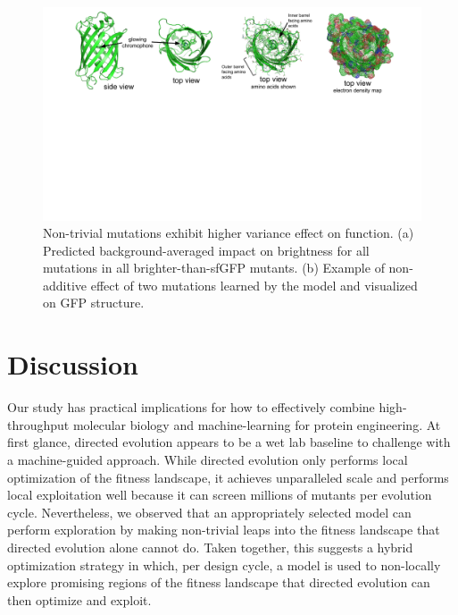 \begin{figure}
  \includegraphics[width=1\linewidth,page=5,trim={0cm 9cm 0cm 0}]{figures/2018-05-09-NIPS_2018_Figures.pdf}
  \caption[Non-trivial mutations exhibit higher variance effect on function]{\small{
    Non-trivial mutations exhibit higher variance effect on function. (a) Predicted background-averaged impact on brightness for all mutations in all brighter-than-sfGFP mutants. (b) Example of non-additive effect of two mutations learned by the model and visualized on GFP structure.}
  }
  \label{non-trivial-variance}
  \vspace{-0.6cm}
\end{figure}

\vspace{-3mm}
\section{Discussion}

Our study has practical implications for how to effectively combine high-throughput molecular biology and machine-learning for protein engineering. At first glance, directed evolution appears to be a wet lab baseline to challenge with a machine-guided approach. While directed evolution only performs local optimization of the fitness landscape, it achieves unparalleled scale and performs local exploitation well because it can screen millions of mutants per evolution cycle. Nevertheless, we observed that an appropriately selected model can perform exploration by making non-trivial leaps into the fitness landscape that directed evolution alone cannot do. Taken together, this suggests a hybrid optimization strategy in which, per design cycle, a model is used to non-locally explore promising regions of the fitness landscape that directed evolution can then optimize and exploit.

